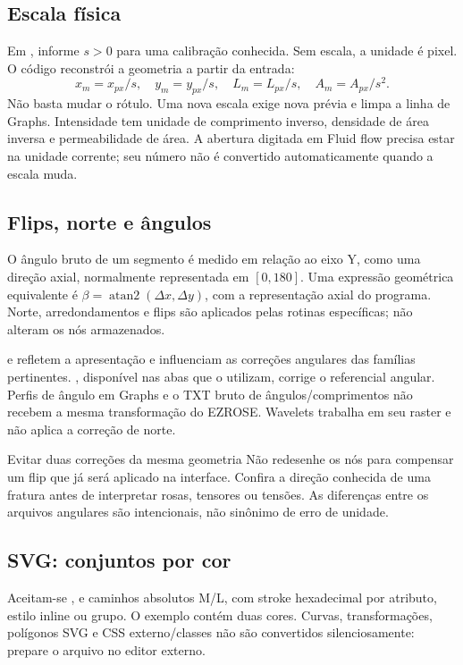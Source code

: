 \subsection{Escala física}
Em , informe \(s>0\) para uma calibração conhecida. Sem escala, a unidade é pixel. O código reconstrói a geometria a partir da entrada:
\begin{equation}
 x_m=x_{px}/s,\quad y_m=y_{px}/s,\quad
 L_m=L_{px}/s,\quad A_m=A_{px}/s^2.
\end{equation}
Não basta mudar o rótulo. Uma nova escala exige nova prévia e limpa a linha de Graphs. Intensidade tem unidade de comprimento inverso, densidade de área inversa e permeabilidade de área. A abertura digitada em Fluid flow precisa estar na unidade corrente; seu número não é convertido automaticamente quando a escala muda.

\subsection{Flips, norte e ângulos}
O ângulo bruto de um segmento é medido em relação ao eixo Y, como uma direção axial, normalmente representada em \([0,180]\). Uma expressão geométrica equivalente é
\(\beta=\operatorname{atan2}(\Delta x,\Delta y)\), com a representação axial do programa. Norte, arredondamentos e flips são aplicados pelas rotinas específicas; não alteram os nós armazenados.

 e  refletem a apresentação e influenciam as correções angulares das famílias pertinentes. , disponível nas abas que o utilizam, corrige o referencial angular. Perfis de ângulo em Graphs e o TXT bruto de ângulos/comprimentos não recebem a mesma transformação do EZROSE. Wavelets trabalha em seu raster e não aplica a correção de norte.

\begin{note}{Evitar duas correções da mesma geometria}
Não redesenhe os nós para compensar um flip que já será aplicado na interface. Confira a direção conhecida de uma fratura antes de interpretar rosas, tensores ou tensões. As diferenças entre os arquivos angulares são intencionais, não sinônimo de erro de unidade.
\end{note}

\subsection{SVG: conjuntos por cor}
Aceitam-se ,  e caminhos absolutos M/L, com stroke hexadecimal por atributo, estilo inline ou grupo. O exemplo  contém duas cores. Curvas, transformações, polígonos SVG e CSS externo/classes não são convertidos silenciosamente: prepare o arquivo no editor externo.

